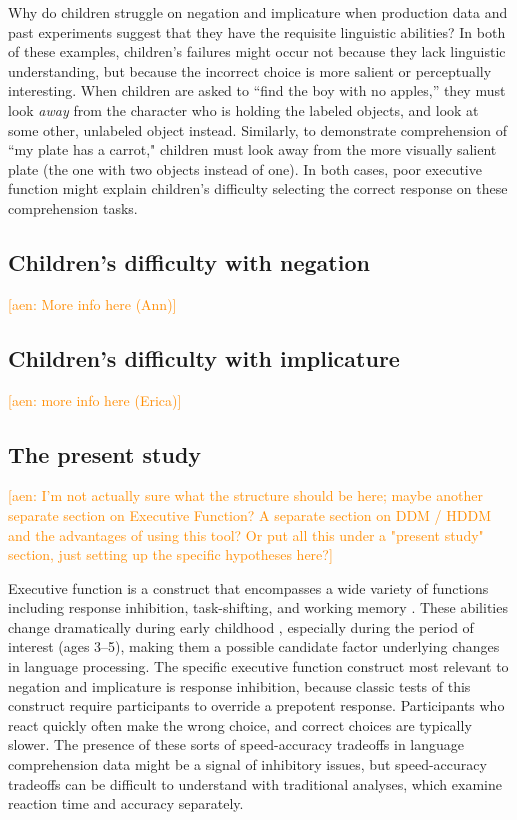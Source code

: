 \documentclass[man, noapacite]{apa2}
\newcommand{\aen}[1]{\textcolor{DarkOrange}{[aen: #1]}}
\begin{document}
Why do children struggle on negation and implicature when production data and past experiments suggest that they have the requisite linguistic abilities? In both of these examples, children's failures might occur not because they lack linguistic understanding, but because the incorrect choice is more salient or perceptually interesting. When children are asked to ``find the boy with no apples,'' they must look \emph{away} from the character who is holding the labeled objects, and look at some other, unlabeled object instead. Similarly, to demonstrate comprehension of ``my plate has a carrot," children must look away from the more visually salient plate (the one with two objects instead of one). In both cases, poor executive function might explain children's difficulty selecting the correct response on these comprehension tasks.



\subsection{Children's difficulty with negation}

\aen{More info here (Ann)}

\subsection{Children's difficulty with implicature}

\aen{more info here (Erica)}

\subsection{The present study}

\aen{I'm not actually sure what the structure should be here; maybe another separate section on Executive Function? A separate section on DDM / HDDM and the advantages of using this tool? Or put all this under a "present study" section, just setting up the specific hypotheses here?}

Executive function is a construct that encompasses a wide variety of functions including response inhibition, task-shifting, and working memory \cite{miyake2000}. These abilities change dramatically during early childhood \cite{diamond1996,davidson2006}, especially during the period of interest (ages 3--5), making them a possible candidate factor underlying changes in language processing. The specific executive function construct most relevant to negation and implicature is response inhibition, because classic tests of this construct require participants to override a prepotent response. Participants who react quickly often make the wrong choice, and correct choices are typically slower. The presence of these sorts of speed-accuracy tradeoffs in language comprehension data might be a signal of inhibitory issues, but speed-accuracy tradeoffs can be difficult to understand with traditional analyses, which examine reaction time and accuracy separately.
\end{document}
